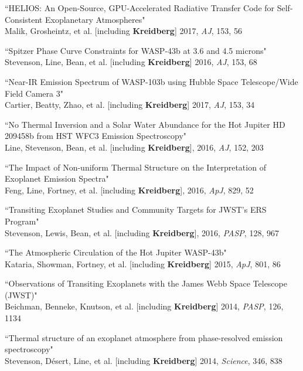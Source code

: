 \documentclass[12pt,letterpaper]{article}
\begin{document}
\begin{compactenum}
\item ``HELIOS: An Open-Source, GPU-Accelerated Radiative Transfer Code for Self-Consistent Exoplanetary Atmospheres"\\
Malik, Grosheintz,  et al. [including \textbf{Kreidberg}] 2017, \textit{AJ}, 153, 56 

\item ``Spitzer Phase Curve Constraints for WASP-43b at 3.6 and 4.5 microns"\\
Stevenson, Line, Bean, et al. [including \textbf{Kreidberg}] 2016, \textit{AJ}, 153, 68 

\item ``Near-IR Emission Spectrum of WASP-103b using Hubble Space Telescope/Wide Field Camera 3"\\
Cartier, Beatty, Zhao, et al. [including \textbf{Kreidberg}] 2017, \textit{AJ}, 153, 34


\item ``No Thermal Inversion and a Solar Water Abundance for the Hot Jupiter HD 209458b from HST WFC3 Emission Spectroscopy"\\
Line, Stevenson, Bean, et al. [including \textbf{Kreidberg}], 2016, \textit{AJ}, 152, 203 

\item ``The Impact of Non-uniform Thermal Structure on the Interpretation of Exoplanet Emission Spectra"\\
Feng, Line, Fortney, et al. [including \textbf{Kreidberg}], 2016, \textit{ApJ}, 829, 52

\item ``Transiting Exoplanet Studies and Community Targets for JWST's ERS Program"\\
Stevenson, Lewis, Bean, et al. [including \textbf{Kreidberg}], 2016, \textit{PASP}, 128, 967 

\item ``The Atmospheric Circulation of the Hot Jupiter WASP-43b" \\
Kataria, Showman, Fortney, et al. [including \textbf{Kreidberg}] 2015, \textit{ApJ}, 801, 86

\item ``Observations of Transiting Exoplanets with the James Webb Space Telescope (JWST)"\\
Beichman, Benneke, Knutson, et al. [including \textbf{Kreidberg}] 2014, \textit{PASP}, 126, 1134

\item ``Thermal structure of an exoplanet atmosphere from phase-resolved emission spectroscopy"\\
Stevenson, D\'esert, Line, et al. [including \textbf{Kreidberg}] 2014, \textit{Science}, 346, 838


\end{compactenum}
\end{document}
